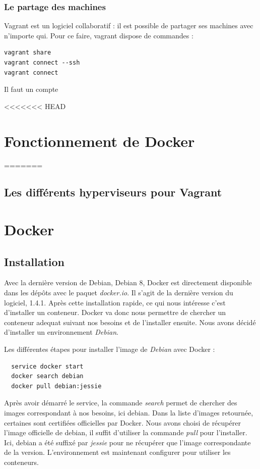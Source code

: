 \documentclass[12pt,a4paper]{article}
\begin{document}
\subsubsection{Le partage des machines}
Vagrant est un logiciel collaboratif : il est possible de partager ses machines avec n'importe qui. Pour ce faire, vagrant dispose de commandes :
\begin{lstlisting}
vagrant share
vagrant connect --ssh
vagrant connect
\end{lstlisting}
Il faut un compte

<<<<<<< HEAD
\section{Fonctionnement de Docker}
=======
\subsection{Les différents hyperviseurs pour Vagrant}

\section{Docker}
\subsection{Installation}
Avec la dernière version de Debian, Debian 8, Docker est directement disponible dans les dépôts avec le paquet \textit{docker.io}. Il s'agit de la dernière version du logiciel, 1.4.1. Après cette installation rapide, ce qui nous intéresse c'est d'installer un conteneur. Docker va donc nous permettre de chercher un conteneur adequat suivant nos besoins et de l'installer ensuite. Nous avons décidé d'installer un environnement \textit{Debian}.

Les différentes étapes pour installer l'image de \textit{Debian} avec Docker :
\begin{lstlisting}
  service docker start
  docker search debian
  docker pull debian:jessie
\end{lstlisting}

Après avoir démarré le service, la commande \textit{search} permet de chercher des images correspondant à nos besoins, ici debian. Dans la liste d'images retournée, certaines sont certifiées officielles par Docker. Nous avons choisi de récupérer l'image officielle de debian, il suffit d'utiliser la commande \textit{pull} pour l'installer. Ici, debian a été suffixé par \textit{jessie} pour ne récupérer que l'image correspondante de la version. L'environnement est maintenant configurer pour utiliser les conteneurs.
\end{document}
